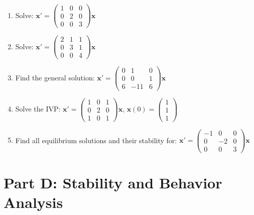 \documentclass[12pt]{article}
\begin{document}
\begin{enumerate}[start=11]
\item Solve: $\mathbf{x}' = \begin{pmatrix} 1 & 0 & 0 \\ 0 & 2 & 0 \\ 0 & 0 & 3 \end{pmatrix}\mathbf{x}$

\item Solve: $\mathbf{x}' = \begin{pmatrix} 2 & 1 & 1 \\ 0 & 3 & 1 \\ 0 & 0 & 4 \end{pmatrix}\mathbf{x}$

\item Find the general solution: $\mathbf{x}' = \begin{pmatrix} 0 & 1 & 0 \\ 0 & 0 & 1 \\ 6 & -11 & 6 \end{pmatrix}\mathbf{x}$

\item Solve the IVP: $\mathbf{x}' = \begin{pmatrix} 1 & 0 & 1 \\ 0 & 2 & 0 \\ 1 & 0 & 1 \end{pmatrix}\mathbf{x}$, $\mathbf{x}(0) = \begin{pmatrix} 1 \\ 1 \\ 1 \end{pmatrix}$

\item Find all equilibrium solutions and their stability for: $\mathbf{x}' = \begin{pmatrix} -1 & 0 & 0 \\ 0 & -2 & 0 \\ 0 & 0 & 3 \end{pmatrix}\mathbf{x}$
\end{enumerate}

\section*{Part D: Stability and Behavior Analysis}
\end{document}
